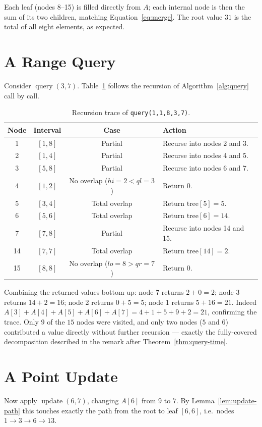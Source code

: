 \documentclass[
  11pt,
  a4paper,
  twoside=false,
  numbers=noenddot,
  headings=big,
  parskip=half,
  toc=bibliography,
  toc=listof,
  bibliography=totoc
]{scrreprt}
\DeclareMathOperator{\Upd}{update}
\DeclareMathOperator{\Qry}{query}
\newcommand{\tblhead}[1]{\textbf{\sffamily #1}}
\begin{document}
Each leaf (nodes 8--15) is filled directly from $A$; each internal node is then the sum of its two children, matching Equation~\eqref{eq:merge}. The root value $31$ is the total of all eight elements, as expected.

\section{A Range Query}
Consider $\Qry(3,7)$. Table~\ref{tab:query-trace} follows the recursion of Algorithm~\ref{alg:query} call by call.

\begin{table}[h]
\centering
\caption{Recursion trace of \texttt{query(1,1,8,3,7)}.}
\label{tab:query-trace}
\begin{tabular}{cccp{5.0cm}}
\toprule
\tblhead{Node} & \tblhead{Interval} & \tblhead{Case} & \tblhead{Action} \\
\midrule
1 & $[1,8]$ & Partial & Recurse into nodes 2 and 3. \\
2 & $[1,4]$ & Partial & Recurse into nodes 4 and 5. \\
3 & $[5,8]$ & Partial & Recurse into nodes 6 and 7. \\
4 & $[1,2]$ & No overlap ($hi=2<ql=3$) & Return $0$. \\
5 & $[3,4]$ & Total overlap & Return $\text{tree}[5]=5$. \\
6 & $[5,6]$ & Total overlap & Return $\text{tree}[6]=14$. \\
7 & $[7,8]$ & Partial & Recurse into nodes 14 and 15. \\
14 & $[7,7]$ & Total overlap & Return $\text{tree}[14]=2$. \\
15 & $[8,8]$ & No overlap ($lo=8>qr=7$) & Return $0$. \\
\bottomrule
\end{tabular}
\end{table}

Combining the returned values bottom-up: node 7 returns $2+0=2$; node 3 returns $14+2=16$; node 2 returns $0+5=5$; node 1 returns $5+16=21$. Indeed $A[3]+A[4]+A[5]+A[6]+A[7]=4+1+5+9+2=21$, confirming the trace. Only $9$ of the $15$ nodes were visited, and only two nodes ($5$ and $6$) contributed a value directly without further recursion --- exactly the fully-covered decomposition described in the remark after Theorem~\ref{thm:query-time}.

\section{A Point Update}
Now apply $\Upd(6,7)$, changing $A[6]$ from $9$ to $7$. By Lemma~\ref{lem:update-path} this touches exactly the path from the root to leaf $[6,6]$, i.e.\ nodes $1\to 3\to 6\to 13$.
\end{document}
